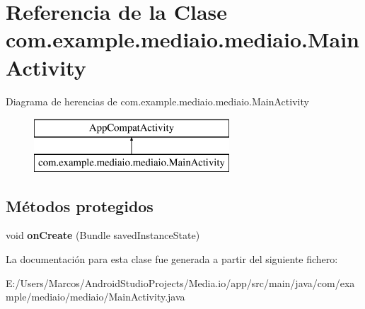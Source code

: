 \hypertarget{classcom_1_1example_1_1mediaio_1_1mediaio_1_1_main_activity}{}\section{Referencia de la Clase com.\+example.\+mediaio.\+mediaio.\+Main\+Activity}
\label{classcom_1_1example_1_1mediaio_1_1mediaio_1_1_main_activity}
Diagrama de herencias de com.\+example.\+mediaio.\+mediaio.\+Main\+Activity\begin{figure}[H]
\begin{center}
\leavevmode
\includegraphics[height=2.000000cm]{classcom_1_1example_1_1mediaio_1_1mediaio_1_1_main_activity}
\end{center}
\end{figure}
\subsection*{Métodos protegidos}
\begin{DoxyCompactItemize}
\item 
\mbox{\label{classcom_1_1example_1_1mediaio_1_1mediaio_1_1_main_activity_ac954ad02ab69c9eb698aa7b2c9de2488}} 
void {\bfseries on\+Create} (Bundle saved\+Instance\+State)
\end{DoxyCompactItemize}


La documentación para esta clase fue generada a partir del siguiente fichero\+:\begin{DoxyCompactItemize}
\item 
E\+:/\+Users/\+Marcos/\+Android\+Studio\+Projects/\+Media.\+io/app/src/main/java/com/example/mediaio/mediaio/Main\+Activity.\+java\end{DoxyCompactItemize}
